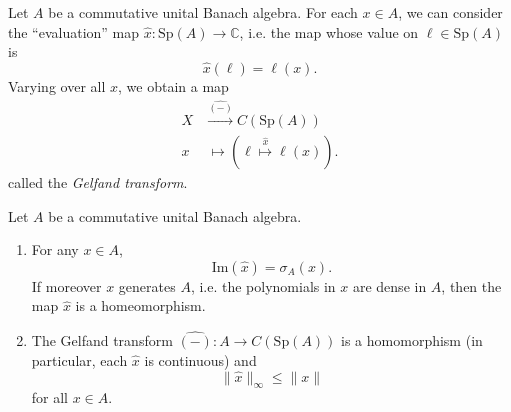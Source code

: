 \documentclass[12pt]{article}
\begin{document}
\begin{definition}
	Let $A$ be a commutative unital Banach algebra. For each $x\in A$, we can consider the ``evaluation'' map $\hat{x}:\text{Sp}(A) \to \mathbb{C}$, i.e. the map whose value on $\ell\in\text{Sp}(A)$ is 
	\begin{equation*}
		\hat{x}(\ell) = \ell(x).
	\end{equation*}
	Varying over all $x$, we obtain a map
	\begin{align*}
		X &\overset{\widehat{(-)}}{\longrightarrow} C(\text{Sp}(A)) \\
		x &\ \mapsto (\ell \overset{\hat{x}}{\mapsto} \ell(x)).
	\end{align*}
	called the \emph{Gelfand transform}.
\end{definition}

\begin{theorem}
\label{thm_spa_spectrum}
	Let $A$ be a commutative unital Banach algebra.
	\begin{enumerate}
		\item For any $x\in A$, 
			\begin{equation*}
				\text{Im}(\hat{x}) = \sigma_A(x). 
			\end{equation*}
			If moreover $x$ generates $A$, i.e. the polynomials in $x$ are dense in $A$, then the map $\hat{x}$ is a homeomorphism.
		\item The Gelfand transform $\widehat{(-)}: A \to C(\text{Sp}(A))$ is a homomorphism (in particular, each $\hat{x}$ is continuous) and 
			\begin{equation*}
				\|\hat{x}\|_\infty \leq \|x\|
			\end{equation*}
			for all $x\in A$.
	\end{enumerate}
\end{theorem}
\end{document}
